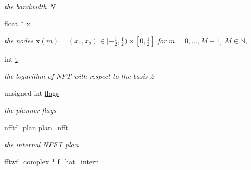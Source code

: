 \begin{DoxyCompactItemize}
\begin{DoxyCompactList}\small\item\em the bandwidth $N$ \end{DoxyCompactList}\item 
\hypertarget{structnfsftf__plan_a110084c9a750d175c70caa7a24d69ae7}{float $\ast$ \hyperlink{structnfsftf__plan_a110084c9a750d175c70caa7a24d69ae7}{x}}\label{structnfsftf__plan_a110084c9a750d175c70caa7a24d69ae7}

\begin{DoxyCompactList}\small\item\em the nodes $\mathbf{x}(m) = \left(x_1,x_2\right) \in [-\frac{1}{2},\frac{1}{2}) \times [0,\frac{1}{2}]$ for $m=0,\ldots, M-1$, $M \in \mathbb{N},$ \end{DoxyCompactList}\item 
\hypertarget{structnfsftf__plan_ad5d65a033c50d321c6affc677e4f5226}{int \hyperlink{structnfsftf__plan_ad5d65a033c50d321c6affc677e4f5226}{t}}\label{structnfsftf__plan_ad5d65a033c50d321c6affc677e4f5226}

\begin{DoxyCompactList}\small\item\em the logarithm of N\-P\-T with respect to the basis 2 \end{DoxyCompactList}\item 
\hypertarget{structnfsftf__plan_a67898ed2ead6812358feeace004b14fe}{unsigned int \hyperlink{structnfsftf__plan_a67898ed2ead6812358feeace004b14fe}{flags}}\label{structnfsftf__plan_a67898ed2ead6812358feeace004b14fe}

\begin{DoxyCompactList}\small\item\em the planner flags \end{DoxyCompactList}\item 
\hypertarget{structnfsftf__plan_a87927611482f2fb3421ea2279993f94a}{\hyperlink{structnfftf__plan}{nfftf\-\_\-plan} \hyperlink{structnfsftf__plan_a87927611482f2fb3421ea2279993f94a}{plan\-\_\-nfft}}\label{structnfsftf__plan_a87927611482f2fb3421ea2279993f94a}

\begin{DoxyCompactList}\small\item\em the internal N\-F\-F\-T plan \end{DoxyCompactList}\item 
\hypertarget{structnfsftf__plan_aa0a6fb494d6378f656c83f191cd4ed1d}{fftwf\-\_\-complex $\ast$ \hyperlink{structnfsftf__plan_aa0a6fb494d6378f656c83f191cd4ed1d}{f\-\_\-hat\-\_\-intern}}\label{structnfsftf__plan_aa0a6fb494d6378f656c83f191cd4ed1d}


\end{DoxyCompactItemize}
